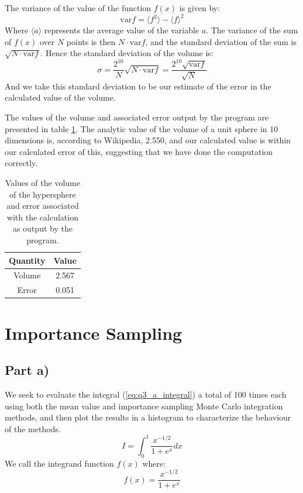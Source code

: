 \documentclass{article}
\begin{document}
The variance of the value of the function $f(x)$ is given by:
\begin{equation}
	\text{var}f = \langle f^2 \rangle - \langle f \rangle^2
\end{equation}
Where $\langle a \rangle$ represents the average value of the variable $a$. The variance of the sum of $f(x)$ over $N$ points is then $N\cdot\text{var}f$, and the standard deviation of the sum is $\sqrt{N\cdot\text{var}f}$. Hence the standard deviation of the volume is:
\begin{equation}
	\sigma = \frac{2^{10}}{N}\sqrt{N\cdot\text{var}f} = \frac{2^{10}\sqrt{\text{var}f}}{\sqrt{N}}
\end{equation}
And we take this standard deviation to be our estimate of the error in the calculated value of the volume.

The values of the volume and associated error output by the program are presented in table \ref{tab:q2}. The analytic value of the volume of a unit sphere in 10 dimensions is, according to Wikipedia, 2.550, and our calculated value is within our calculated error of this, suggesting that we have done the computation correctly.

\begin{table}[H]
	\centering
	\caption{Values of the volume of the hypersphere and error associated with the calculation as output by the program.}
	\label{tab:q2}
	\begin{tabular}{c|c}
		Quantity & Value \\
		\hline
		Volume & 2.567 \\
		Error & 0.051
	\end{tabular}
\end{table}

\section{Importance Sampling}

\subsection{Part a)}

We seek to evaluate the integral (\ref{eq:q3_a_integral}) a total of 100 times each using both the mean value and importance sampling Monte Carlo integration methods, and then plot the results in a histogram to characterize the behaviour of the methods.
\begin{equation}
	\label{eq:q3_a_integral}
	I = \int_0^1 \frac{x^{-1/2}}{1+e^x}dx
\end{equation}
We call the integrand function $f(x)$ where:
\begin{equation}
	f(x) = \frac{x^{-1/2}}{1+e^x}
\end{equation}
\end{document}
